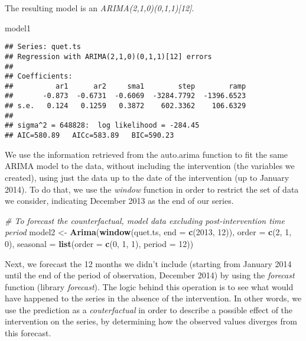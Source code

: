 \documentclass[
]{article}
\newenvironment{Shaded}{\begin{snugshade}}{\end{snugshade}}
\newcommand{\AttributeTok}[1]{\textcolor[rgb]{0.13,0.29,0.53}{#1}}
\newcommand{\CommentTok}[1]{\textcolor[rgb]{0.56,0.35,0.01}{\textit{#1}}}
\newcommand{\DecValTok}[1]{\textcolor[rgb]{0.00,0.00,0.81}{#1}}
\newcommand{\FunctionTok}[1]{\textcolor[rgb]{0.13,0.29,0.53}{\textbf{#1}}}
\newcommand{\NormalTok}[1]{#1}
\newcommand{\OtherTok}[1]{\textcolor[rgb]{0.56,0.35,0.01}{#1}}
\begin{document}
The resulting model is an \emph{ARIMA(2,1,0)(0,1,1){[}12{]}}.

\begin{Shaded}
\begin{Highlighting}[]
\NormalTok{model1}
\end{Highlighting}
\end{Shaded}

\begin{verbatim}
## Series: quet.ts 
## Regression with ARIMA(2,1,0)(0,1,1)[12] errors 
## 
## Coefficients:
##          ar1      ar2     sma1        step        ramp
##       -0.873  -0.6731  -0.6069  -3284.7792  -1396.6523
## s.e.   0.124   0.1259   0.3872    602.3362    106.6329
## 
## sigma^2 = 648828:  log likelihood = -284.45
## AIC=580.89   AICc=583.89   BIC=590.23
\end{verbatim}

We use the information retrieved from the auto.arima function to fit the same ARIMA model to the data, without including the intervention (the variables we created), using just the data up to the date of the intervention (up to January 2014). To do that, we use the \emph{window} function in order to restrict the set of data we consider, indicating December 2013 as the end of our series.

\begin{Shaded}
\begin{Highlighting}[]
\CommentTok{\# To forecast the counterfactual, model data excluding post{-}intervention time period}
\NormalTok{model2 }\OtherTok{\textless{}{-}} \FunctionTok{Arima}\NormalTok{(}\FunctionTok{window}\NormalTok{(quet.ts, }\AttributeTok{end =} \FunctionTok{c}\NormalTok{(}\DecValTok{2013}\NormalTok{, }\DecValTok{12}\NormalTok{)), }\AttributeTok{order =} \FunctionTok{c}\NormalTok{(}\DecValTok{2}\NormalTok{, }\DecValTok{1}\NormalTok{, }\DecValTok{0}\NormalTok{), }
                \AttributeTok{seasonal =} \FunctionTok{list}\NormalTok{(}\AttributeTok{order =} \FunctionTok{c}\NormalTok{(}\DecValTok{0}\NormalTok{, }\DecValTok{1}\NormalTok{, }\DecValTok{1}\NormalTok{), }\AttributeTok{period =} \DecValTok{12}\NormalTok{))}
\end{Highlighting}
\end{Shaded}

Next, we forecast the 12 months we didn't include (starting from January 2014 until the end of the period of observation, December 2014) by using the \emph{forecast} function (library \emph{forecast}). The logic behind this operation is to see what would have happened to the series in the absence of the intervention. In other words, we use the prediction as a \emph{couterfactual} in order to describe a possible effect of the intervention on the series, by determining how the observed values diverges from this forecast.
\end{document}
